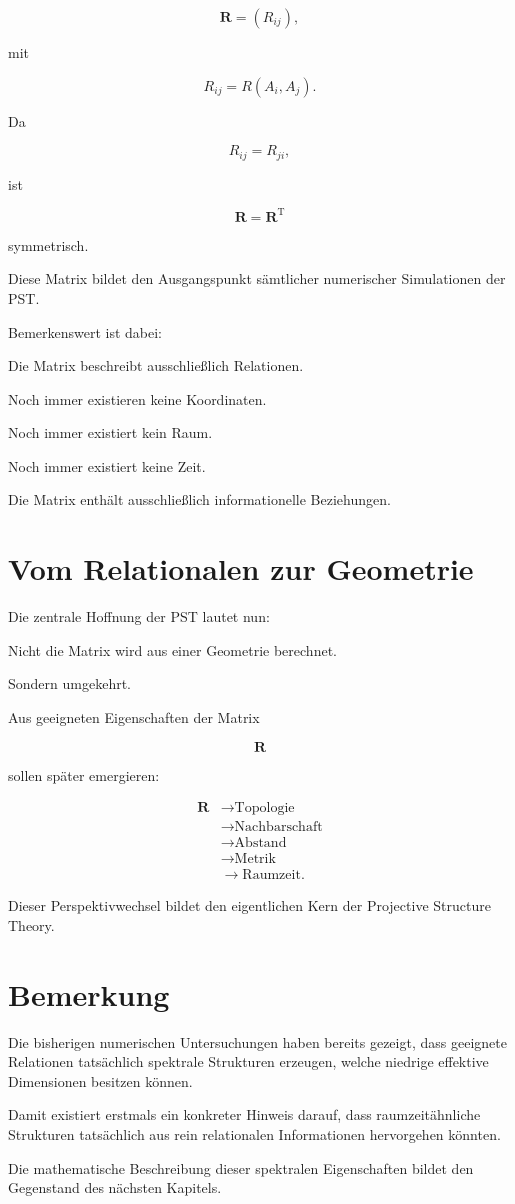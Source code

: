 \[
\mathbf{R}
=
(R_{ij}),
\]

mit

\[
R_{ij}
=
R(A_i,A_j).
\]

Da

\[
R_{ij}=R_{ji},
\]

ist

\[
\mathbf{R}
=
\mathbf{R}^{\mathrm T}
\]

symmetrisch.

Diese Matrix bildet den Ausgangspunkt sämtlicher numerischer
Simulationen der PST.

Bemerkenswert ist dabei:

Die Matrix beschreibt ausschließlich Relationen.

Noch immer existieren keine Koordinaten.

Noch immer existiert kein Raum.

Noch immer existiert keine Zeit.

Die Matrix enthält ausschließlich informationelle Beziehungen.

\section{Vom Relationalen zur Geometrie}

Die zentrale Hoffnung der PST lautet nun:

Nicht die Matrix wird aus einer Geometrie berechnet.

Sondern umgekehrt.

Aus geeigneten Eigenschaften der Matrix

\[
\mathbf R
\]

sollen später emergieren:

\begin{align}
\mathbf R
&\longrightarrow
\text{Topologie}
\\
&\longrightarrow
\text{Nachbarschaft}
\\
&\longrightarrow
\text{Abstand}
\\
&\longrightarrow
\text{Metrik}
\\
&\longrightarrow
\text{Raumzeit}.
\end{align}

Dieser Perspektivwechsel bildet den eigentlichen Kern der Projective
Structure Theory.

\section{Bemerkung}

Die bisherigen numerischen Untersuchungen haben bereits gezeigt, dass
geeignete Relationen tatsächlich spektrale Strukturen erzeugen, welche
niedrige effektive Dimensionen besitzen können.

Damit existiert erstmals ein konkreter Hinweis darauf, dass
raumzeitähnliche Strukturen tatsächlich aus rein relationalen
Informationen hervorgehen könnten.

Die mathematische Beschreibung dieser spektralen Eigenschaften bildet den
Gegenstand des nächsten Kapitels.

